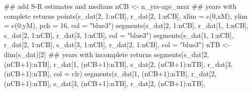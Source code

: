 \documentclass[11pt,]{article}
\newenvironment{Shaded}{}{}
\newcommand{\KeywordTok}[1]{\textcolor[rgb]{0.00,0.00,1.00}{#1}}
\newcommand{\DataTypeTok}[1]{#1}
\newcommand{\DecValTok}[1]{#1}
\newcommand{\StringTok}[1]{\textcolor[rgb]{0.00,0.50,0.50}{#1}}
\newcommand{\OperatorTok}[1]{#1}
\newcommand{\NormalTok}[1]{#1}
\begin{document}
\begin{Shaded}
\begin{Highlighting}[]
\NormalTok{## add S-R estimates and medians}
\NormalTok{nCB <-}\StringTok{ }\NormalTok{n_yrs}\OperatorTok{-}\NormalTok{age_max}
\NormalTok{## years with complete returns}
\KeywordTok{points}\NormalTok{(s_dat[}\DecValTok{2}\NormalTok{, }\DecValTok{1}\OperatorTok{:}\NormalTok{nCB], r_dat[}\DecValTok{2}\NormalTok{, }\DecValTok{1}\OperatorTok{:}\NormalTok{nCB],}
       \DataTypeTok{xlim =} \KeywordTok{c}\NormalTok{(}\DecValTok{0}\NormalTok{,xM), }\DataTypeTok{ylim =} \KeywordTok{c}\NormalTok{(}\DecValTok{0}\NormalTok{,yM),}
       \DataTypeTok{pch =} \DecValTok{16}\NormalTok{, }\DataTypeTok{col =} \StringTok{"blue3"}\NormalTok{)}
\KeywordTok{segments}\NormalTok{(s_dat[}\DecValTok{2}\NormalTok{, }\DecValTok{1}\OperatorTok{:}\NormalTok{nCB], r_dat[}\DecValTok{1}\NormalTok{, }\DecValTok{1}\OperatorTok{:}\NormalTok{nCB],}
\NormalTok{         s_dat[}\DecValTok{2}\NormalTok{, }\DecValTok{1}\OperatorTok{:}\NormalTok{nCB], r_dat[}\DecValTok{3}\NormalTok{, }\DecValTok{1}\OperatorTok{:}\NormalTok{nCB],}
         \DataTypeTok{col =} \StringTok{"blue3"}\NormalTok{)}
\KeywordTok{segments}\NormalTok{(s_dat[}\DecValTok{1}\NormalTok{, }\DecValTok{1}\OperatorTok{:}\NormalTok{nCB], r_dat[}\DecValTok{2}\NormalTok{, }\DecValTok{1}\OperatorTok{:}\NormalTok{nCB],}
\NormalTok{         s_dat[}\DecValTok{3}\NormalTok{, }\DecValTok{1}\OperatorTok{:}\NormalTok{nCB], r_dat[}\DecValTok{2}\NormalTok{, }\DecValTok{1}\OperatorTok{:}\NormalTok{nCB],}
         \DataTypeTok{col =} \StringTok{"blue3"}\NormalTok{)}
\NormalTok{nTB <-}\StringTok{ }\KeywordTok{dim}\NormalTok{(s_dat)[}\DecValTok{2}\NormalTok{]}
\NormalTok{## years with incomplete returns}
\KeywordTok{segments}\NormalTok{(s_dat[}\DecValTok{2}\NormalTok{, (nCB}\OperatorTok{+}\DecValTok{1}\NormalTok{)}\OperatorTok{:}\NormalTok{nTB], r_dat[}\DecValTok{1}\NormalTok{, (nCB}\OperatorTok{+}\DecValTok{1}\NormalTok{)}\OperatorTok{:}\NormalTok{nTB],}
\NormalTok{         s_dat[}\DecValTok{2}\NormalTok{, (nCB}\OperatorTok{+}\DecValTok{1}\NormalTok{)}\OperatorTok{:}\NormalTok{nTB], r_dat[}\DecValTok{3}\NormalTok{, (nCB}\OperatorTok{+}\DecValTok{1}\NormalTok{)}\OperatorTok{:}\NormalTok{nTB],}
         \DataTypeTok{col =}\NormalTok{ clr)}
\KeywordTok{segments}\NormalTok{(s_dat[}\DecValTok{1}\NormalTok{, (nCB}\OperatorTok{+}\DecValTok{1}\NormalTok{)}\OperatorTok{:}\NormalTok{nTB], r_dat[}\DecValTok{2}\NormalTok{, (nCB}\OperatorTok{+}\DecValTok{1}\NormalTok{)}\OperatorTok{:}\NormalTok{nTB],}
\NormalTok{         s_dat[}\DecValTok{3}\NormalTok{, (nCB}\OperatorTok{+}\DecValTok{1}\NormalTok{)}\OperatorTok{:}\NormalTok{nTB], r_dat[}\DecValTok{2}\NormalTok{, (nCB}\OperatorTok{+}\DecValTok{1}\NormalTok{)}\OperatorTok{:}\NormalTok{nTB],}

\end{Highlighting}
\end{Shaded}
\end{document}
